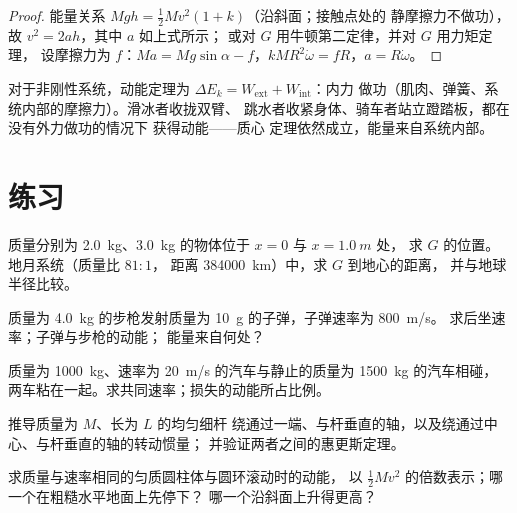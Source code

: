 \begin{proof}
能量关系 $Mgh = \tfrac12 Mv^2(1 + k)$（沿斜面；接触点处的
静摩擦力不做功），故 $v^2 = 2ah$，其中 $a$ 如上式所示；
或对 $G$ 用牛顿第二定律，并对 $G$ 用力矩定理，
设摩擦力为 $f$：$Ma = Mg\sin\alpha - f$，$kMR^2\dot\omega = fR$，$a = R\dot\omega$。
\end{proof}

\begin{remark}[可变形系统]\label{rem:b1:systems-of-points:deformable}
对于非刚性系统，动能定理为
$\Delta E_k = W_{\mathrm{ext}} + W_{\mathrm{int}}$：内力
做功（肌肉、弹簧、系统内部的摩擦力）。滑冰者收拢双臂、
跳水者收紧身体、骑车者站立蹬踏板，都在没有外力做功的情况下
获得动能——质心
定理依然成立，能量来自系统内部。
\end{remark}

\section{练习}

\begin{exercise}[$\star$]\label{exo:b1:systems-of-points:1}
质量分别为 \qty{2.0}{kg}、\qty{3.0}{kg} 的物体位于 $x = 0$ 与 $x = \qty{1.0}{m}$ 处，
求 $G$ 的位置。地月系统（质量比 $81:1$，
距离 \qty{384000}{km}）中，求 $G$ 到地心的距离，
并与地球半径比较。
\end{exercise}

\begin{exercise}[$\star$]\label{exo:b1:systems-of-points:2}
质量为 \qty{4.0}{kg} 的步枪发射质量为 \qty{10}{g} 的子弹，子弹速率为 \qty{800}{m/s}。
求后坐速率；子弹与步枪的动能；
能量来自何处？
\end{exercise}

\begin{exercise}[$\star$]\label{exo:b1:systems-of-points:3}
质量为 \qty{1000}{kg}、速率为 \qty{20}{m/s} 的汽车与静止的质量为 \qty{1500}{kg} 的汽车相碰，
两车粘在一起。求共同速率；损失的动能所占比例。
\end{exercise}

\begin{exercise}[$\star$]\label{exo:b1:systems-of-points:4}
推导质量为 $M$、长为 $L$ 的均匀细杆
绕通过一端、与杆垂直的轴，以及绕通过中心、与杆垂直的轴的转动惯量；
并验证两者之间的惠更斯定理。
\end{exercise}

\begin{exercise}[$\star\star$]\label{exo:b1:systems-of-points:5}
求质量与速率相同的匀质圆柱体与圆环滚动时的动能，
以 $\tfrac12 Mv^2$ 的倍数表示；哪一个在粗糙水平地面上先停下？
哪一个沿斜面上升得更高？
\end{exercise}

